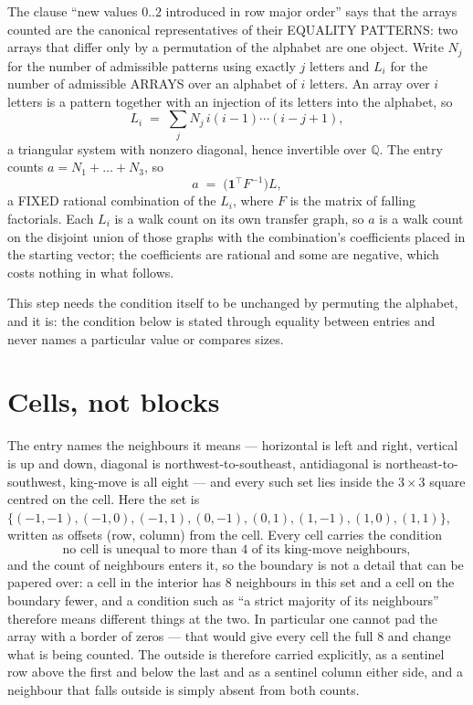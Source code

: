 \documentclass[11pt,a4paper]{article}
\theoremstyle{plain}
\theoremstyle{definition}
\begin{document}
The clause ``new values $0..2$ introduced in row major order'' says that the arrays
counted are the canonical representatives of their EQUALITY PATTERNS: two arrays that differ
only by a permutation of the alphabet are one object. Write $N_j$ for the number of admissible
patterns using exactly $j$ letters and $L_i$ for the number of admissible ARRAYS over an
alphabet of $i$ letters. An array over $i$ letters is a pattern together with an injection of
its letters into the alphabet, so
\[
L_i\;=\;\sum_{j}N_j\,i(i-1)\cdots(i-j+1),
\]
a triangular system with nonzero diagonal, hence invertible over $\mathbb{Q}$. The entry
counts $a=N_1+\dots+N_{3}$, so
\[
a\;=\;\bigl(\mathbf{1}^{\!\top}F^{-1}\bigr)L ,
\]
a FIXED rational combination of the $L_i$, where $F$ is the matrix of falling factorials.
Each $L_i$ is a walk count on its own transfer graph, so $a$ is a walk count on the disjoint
union of those graphs with the combination's coefficients placed in the starting vector; the
coefficients are rational and some are negative, which costs nothing in what follows.

This step needs the condition itself to be unchanged by permuting the alphabet, and it is:
the condition below is stated through equality between entries and never names a particular
value or compares sizes.

\section{Cells, not blocks}

The entry names the neighbours it means --- horizontal is left and right, vertical is up and
down, diagonal is northwest-to-southeast, antidiagonal is northeast-to-southwest, king-move is
all eight --- and every such set lies inside the $3\times3$ square centred on the cell. Here
the set is $\{(-1,-1), (-1,0), (-1,1), (0,-1), (0,1), (1,-1), (1,0), (1,1)\}$, written as offsets (row, column) from the cell. Every cell carries
the condition
\[
\text{no cell is unequal to more than 4 of its king-move neighbours},
\]
and the count of neighbours enters it, so the boundary is not a detail that can be papered
over: a cell in the interior has $8$ neighbours in this set and a cell on the boundary
fewer, and a condition such as ``a strict majority of its neighbours'' therefore means
different things at the two. In particular one cannot pad the array with a border of zeros ---
that would give every cell the full $8$ and change what is being counted. The outside is
therefore carried
explicitly, as a sentinel row above the first and below the last and as a sentinel column
either side, and a neighbour that falls outside is simply absent from both counts.
\end{document}
